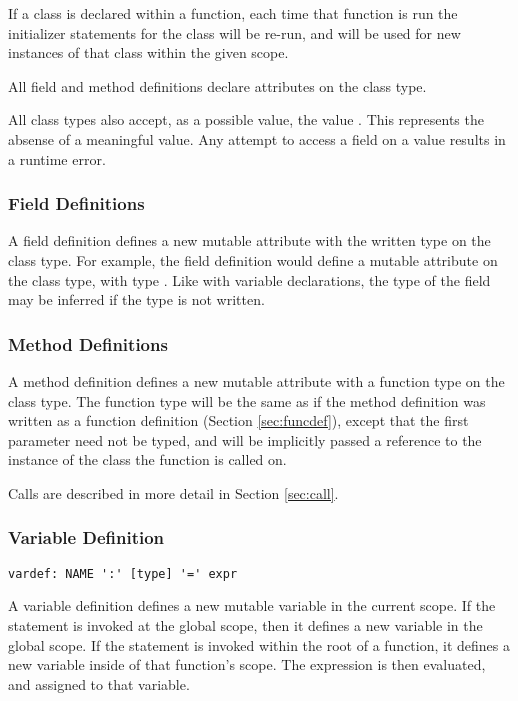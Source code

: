 If a class is declared within a function, each time that function is run the
initializer statements for the class will be re-run, and will be used for
new instances of that class within the given scope.

All field and method definitions declare attributes on the class type.

All class types also accept, as a possible value, the value . This
represents the absense of a meaningful value. Any attempt to access a field on a
 value results in a runtime error.

\subsubsection{Field Definitions}
\label{sec:fielddef}
A field definition defines a new mutable attribute with the written type on the
class type. For example, the field definition  would define a
mutable attribute  on the class type, with type . Like with
variable declarations, the type of the field may be inferred if the type is not
written.

\subsubsection{Method Definitions}
\label{sec:methoddef}
A method definition defines a new mutable attribute with a function type on the
class type. The function type will be the same as if the method definition was
written as a function definition (Section \ref{sec:funcdef}), except that the
first parameter need not be typed, and will be implicitly passed a reference to
the instance of the class the function is called on.

Calls are described in more detail in Section \ref{sec:call}.

\subsubsection{Variable Definition}
\label{sec:vardef}

\begin{lstlisting}
vardef: NAME ':' [type] '=' expr
\end{lstlisting}

A variable definition defines a new mutable variable in the current scope. If
the statement is invoked at the global scope, then it defines a new variable in
the global scope. If the statement is invoked within the root of a function, it
defines a new variable inside of that function's scope. The expression is then
evaluated, and assigned to that variable.

